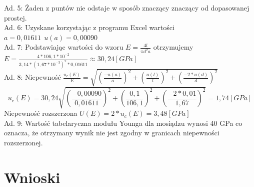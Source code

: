 \documentclass[a4paper,10pt,twoside]{article}
\begin{document}
\begin{figure}[h]
\end{figure}
\noindent
Ad. 5: Żaden z puntów nie odstaje w sposób znaczący znaczący od dopasowanej prostej.\\
Ad. 6: Uzyskane korzystając z programu Excel wartości $a = 0,01611 \hspace{5pt}u(a) = 0,00090$\\
Ad. 7: Podstawiając wartości do wzoru $E = \frac{4l}{\pi d^2 a}$ otrzymujemy $E = \frac{4*106,1*10^{-2}}{3,14 * (1,67*10^{-3})^2 * 0,01611} \approx 30,24[GPa]$\\
Ad. 8: Niepewność $\frac{u_c(E)}{E} = \sqrt{\left (\frac{-u(a)}{a} \right )^2 + \left (\frac{u(l)}{l} \right )^2 + \left (\frac{-2*u(d)}{d} \right )^2}$ $$u_c(E) = 30,24\sqrt{\left (\frac{-0,00090}{0,01611} \right )^2 + \left (\frac{0,1}{106,1} \right )^2 + \left (\frac{-2*0,01}{1,67} \right )^2} = 1,74[GPa]$$ Niepewność rozszerzona $U(E) = 2*u_c(E) = 3,48[GPa]$\\
Ad. 9: Wartość tabelaryczna modułu Younga dla mosiądzu wynosi 40 GPa co oznacza, że otrzymany wynik nie jest zgodny w granicach niepewności rozszerzonej.

	\section{Wnioski}
\end{document}
